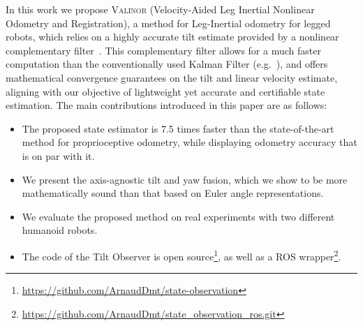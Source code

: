 \documentclass{IJCAS}
\begin{document}
In this work we propose {\scshape Valinor} (Velocity-Aided Leg Inertial Nonlinear Odometry and Registration), a method for Leg-Inertial odometry for legged robots, which relies on a highly accurate tilt estimate provided by a nonlinear complementary filter~\cite{benallegue2020LyapunovStableOrientationEstimatorHumanoids}. This complementary filter allows for a much faster computation than the conventionally used Kalman Filter (e.g.~\cite{Hartley2020RIEKF}), and offers mathematical convergence guarantees on the tilt and linear velocity estimate, aligning with our objective of lightweight yet accurate and certifiable state estimation.
The main contributions introduced in this paper are as follows:
\begin{itemize}
  \item The proposed state estimator is 7.5 times faster than the state-of-the-art method for proprioceptive odometry, while displaying odometry accuracy that is on par with it.
  \item We present the axis-agnostic tilt and yaw fusion, which we show to be more mathematically sound than that based on Euler angle representations.
  \item We evaluate the proposed method on real experiments with two different humanoid robots.
  \item The code of the Tilt Observer is open source\footnote{\scriptsize \url{https://github.com/ArnaudDmt/state-observation}}, as well as a ROS wrapper\footnote{\scriptsize \url{https://github.com/ArnaudDmt/state_observation_ros.git}}.
\end{itemize}

\end{document}
